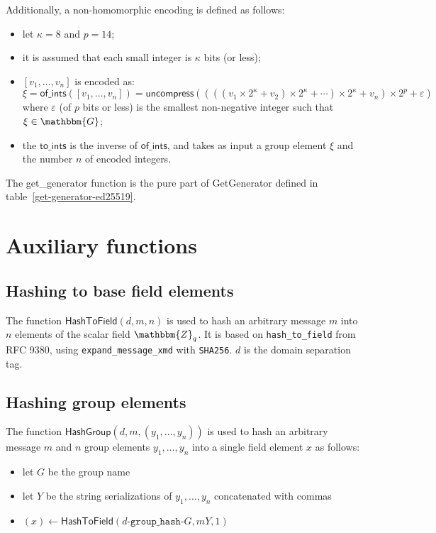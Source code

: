 \documentclass[a4paper]{article}
\newcommand{\G}{\mathbbm{G}}
\newcommand{\Z}{\mathbbm{Z}}
\begin{document}
Additionally, a non-homomorphic encoding is defined as follows:
\begin{itemize}
\item let $\kappa=8$ and $p=14$;
\item it is assumed that each small integer is $\kappa$ bits (or less);
\item $[v_1,\dots,v_n]$ is encoded as:
  \[
    \xi=\textsf{of\_ints}([v_1,\dots,v_n])=\textsf{uncompress}((((v_1\times
    2^\kappa+v_2)\times 2^\kappa+\dotsb)\times 2^\kappa+v_n)\times
    2^p+\varepsilon)
  \]
  where $\varepsilon$ (of $p$ bits or less) is the smallest
  non-negative integer such that $\xi\in\G$;
\item the $\textsf{to\_ints}$ is the inverse of $\textsf{of\_ints}$, and
  takes as input a group element $\xi$ and the number $n$ of encoded
  integers.
\end{itemize}
The \textsf{get\_generator} function is the pure part of
\textsf{GetGenerator} defined in table~\ref{get-generator-ed25519}.

\section{Auxiliary functions}
\label{auxiliary-functions}

\subsection{Hashing to base field elements}
\label{hash-to-field}

The function $\textsf{HashToField}(d,m,n)$ is used to hash an
arbitrary message $m$ into $n$ elements of the scalar field $\Z_q$. It
is based on \verb|hash_to_field| from RFC 9380, using
\verb|expand_message_xmd| with \verb|SHA256|. $d$ is the domain
separation tag.

\subsection{Hashing group elements}
\label{hash-group}

The function $\textsf{HashGroup}(d,m,(y_1,\dotsc,y_n))$ is used to
hash an arbitrary message $m$ and $n$ group elements $y_1,\dotsc,y_n$
into a single field element $x$ as follows:
\begin{itemize}
\item let $G$ be the group name
\item let $Y$ be the string serializations of $y_1,\dots,y_n$
  concatenated with commas
\item
  $(x)\leftarrow\textsf{HashToField}(d\texttt{-group\_hash-}G,mY,1)$
\end{itemize}
\end{document}
